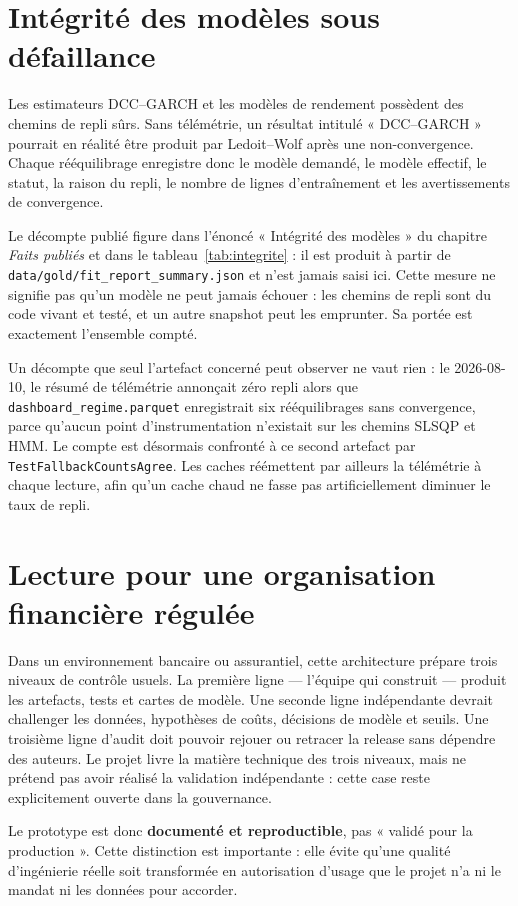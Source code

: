 \section{Intégrité des modèles sous défaillance}

Les estimateurs DCC--GARCH et les modèles de rendement possèdent des chemins de
repli sûrs. Sans télémétrie, un résultat intitulé « DCC--GARCH » pourrait en
réalité être produit par Ledoit--Wolf après une non-convergence. Chaque
rééquilibrage enregistre donc le modèle demandé, le modèle effectif, le statut,
la raison du repli, le nombre de lignes d'entraînement et les avertissements de
convergence.

Le décompte publié figure dans l'énoncé « Intégrité des modèles » du chapitre
\emph{Faits publiés} et dans le tableau~\ref{tab:integrite} : il est produit à
partir de \texttt{data/gold/fit\_report\_summary.json} et n'est jamais saisi
ici. Cette mesure ne signifie pas qu'un modèle ne peut jamais échouer : les
chemins de repli sont du code vivant et testé, et un autre snapshot peut les
emprunter. Sa portée est exactement l'ensemble compté.

Un décompte que seul l'artefact concerné peut observer ne vaut rien : le
2026-08-10, le résumé de télémétrie annonçait zéro repli alors que
\texttt{dashboard\_regime.parquet} enregistrait six rééquilibrages sans
convergence, parce qu'aucun point d'instrumentation n'existait sur les chemins
SLSQP et HMM. Le compte est désormais confronté à ce second artefact par
\texttt{TestFallbackCountsAgree}. Les caches réémettent par ailleurs la
télémétrie à chaque lecture, afin qu'un cache chaud ne fasse pas
artificiellement diminuer le taux de repli.

\section{Lecture pour une organisation financière régulée}

Dans un environnement bancaire ou assurantiel, cette architecture prépare trois
niveaux de contrôle usuels. La première ligne — l'équipe qui construit — produit
les artefacts, tests et cartes de modèle. Une seconde ligne indépendante devrait
challenger les données, hypothèses de coûts, décisions de modèle et seuils. Une
troisième ligne d'audit doit pouvoir rejouer ou retracer la release sans dépendre
des auteurs. Le projet livre la matière technique des trois niveaux, mais ne
prétend pas avoir réalisé la validation indépendante : cette case reste
explicitement ouverte dans la gouvernance.

Le prototype est donc \textbf{documenté et reproductible}, pas « validé pour la
production ». Cette distinction est importante : elle évite qu'une qualité
d'ingénierie réelle soit transformée en autorisation d'usage que le projet n'a
ni le mandat ni les données pour accorder.
